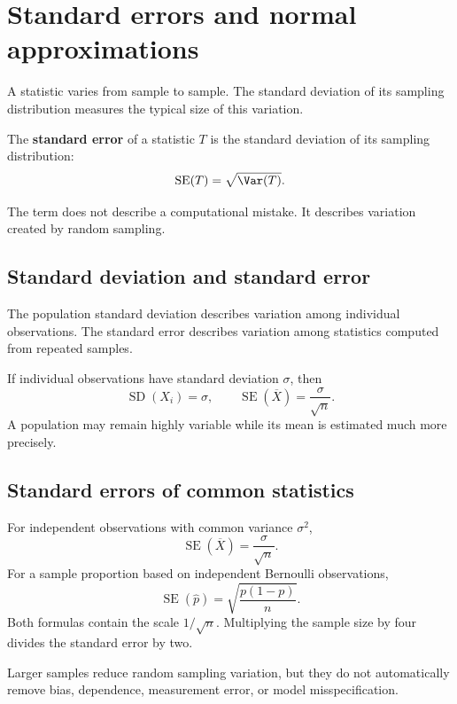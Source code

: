 \section{Standard errors and normal approximations}

A statistic varies from sample to sample. The standard deviation of its sampling
distribution measures the typical size of this variation.

\begin{definitionbox}
The \textbf{standard error} of a statistic \(T\) is the standard deviation of its
sampling distribution:
\[
\operatorname{SE}(T)=\sqrt{\Var(T)}.
\]
\end{definitionbox}

The term does not describe a computational mistake. It describes variation
created by random sampling.

\subsection*{Standard deviation and standard error}

The population standard deviation describes variation among individual
observations. The standard error describes variation among statistics computed
from repeated samples.

If individual observations have standard deviation \(\sigma\), then
\[
\operatorname{SD}(X_i)=\sigma,
\qquad
\operatorname{SE}(\overline X)=\frac{\sigma}{\sqrt n}.
\]
A population may remain highly variable while its mean is estimated much more
precisely.

\subsection*{Standard errors of common statistics}

For independent observations with common variance \(\sigma^2\),
\[
\operatorname{SE}(\overline X)=\frac{\sigma}{\sqrt n}.
\]
For a sample proportion based on independent Bernoulli observations,
\[
\operatorname{SE}(\widehat p)
=
\sqrt{\frac{p(1-p)}{n}}.
\]
Both formulas contain the scale \(1/\sqrt n\). Multiplying the sample size by four
divides the standard error by two.

\begin{remarkbox}
Larger samples reduce random sampling variation, but they do not automatically
remove bias, dependence, measurement error, or model misspecification.
\end{remarkbox}

